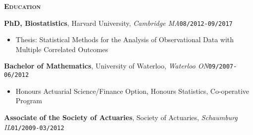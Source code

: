 \documentclass[10pt,english]{article}
\begin{document}
\vspace{3mm}

\begin{mdframed}[backgroundcolor=bgcolor,linewidth=3pt]
\textbf{\textsc{Education}}
\end{mdframed}

\textbf{PhD, Biostatistics}, Harvard University, \textit{Cambridge
MA}\hfill \texttt{08/2012-09/2017}
\begin{itemize}
\item Thesis: Statistical Methods for the Analysis of Observational Data
with Multiple Correlated Outcomes
\end{itemize}

\vspace{2mm}

\textbf{Bachelor of Mathematics}, University of Waterloo, \textit{Waterloo
ON}\hfill \texttt{09/2007-06/2012}
\begin{itemize}
\item Honours Actuarial Science/Finance Option, Honours Statistics, Co-operative
Program
\end{itemize}

\vspace{2mm}

\textbf{Associate of the Society of Actuaries}, Society of Actuaries,
\textit{Schaumburg IL}\hfill \texttt{01/2009-03/2012}
\end{document}
